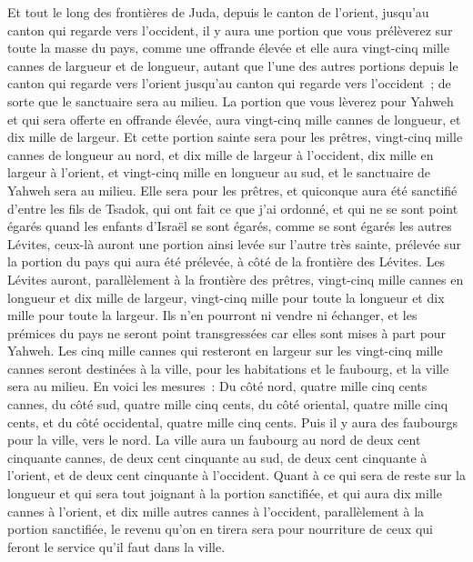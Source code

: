 \begin{multicols}{2}
Et tout le long des frontières de Juda, depuis le canton de l'orient, jusqu'au canton qui regarde vers l'occident, il y aura une portion que vous prélèverez sur toute la masse du pays, comme une offrande élevée et elle aura vingt-cinq mille cannes de largueur et de longueur, autant que l'une des autres portions depuis le canton qui regarde vers l'orient jusqu'au canton qui regarde vers l'occident~; de sorte que le sanctuaire sera au milieu.
La portion que vous lèverez pour Yahweh et qui sera offerte en offrande élevée, aura vingt-cinq mille cannes de longueur, et dix mille de largeur.
Et cette portion sainte sera pour les prêtres, vingt-cinq mille cannes de longueur au nord, et dix mille de largeur à l'occident, dix mille en largeur à l'orient, et vingt-cinq mille en longueur au sud, et le sanctuaire de Yahweh sera au milieu.
Elle sera pour les prêtres, et quiconque aura été sanctifié d'entre les fils de Tsadok, qui ont fait ce que j'ai ordonné, et qui ne se sont point égarés quand les enfants d'Israël se sont égarés, comme se sont égarés les autres Lévites,
ceux-là auront une portion ainsi levée sur l'autre très sainte, prélevée sur la portion du pays qui aura été prélevée, à côté de la frontière des Lévites.
Les Lévites auront, parallèlement à la frontière des prêtres, vingt-cinq mille cannes en longueur et dix mille de largeur, vingt-cinq mille pour toute la longueur et dix mille pour toute la largeur.
Ils n'en pourront ni vendre ni échanger, et les prémices du pays ne seront point transgressées car elles sont mises à part pour Yahweh.
Les cinq mille cannes qui resteront en largeur sur les vingt-cinq mille cannes seront destinées à la ville, pour les habitations et le faubourg, et la ville sera au milieu.
En voici les mesures~: Du côté nord, quatre mille cinq cents cannes, du côté sud, quatre mille cinq cents, du côté oriental, quatre mille cinq cents, et du côté occidental, quatre mille cinq cents.
Puis il y aura des faubourgs pour la ville, vers le nord. La ville aura un faubourg au nord de deux cent cinquante cannes, de deux cent cinquante au sud, de deux cent cinquante à l'orient, et de deux cent cinquante à l'occident.
Quant à ce qui sera de reste sur la longueur et qui sera tout joignant à la portion sanctifiée, et qui aura dix mille cannes à l'orient, et dix mille autres cannes à l'occident, parallèlement à la portion sanctifiée, le revenu qu'on en tirera sera pour nourriture de ceux qui feront le service qu'il faut dans la ville.

\end{multicols}
